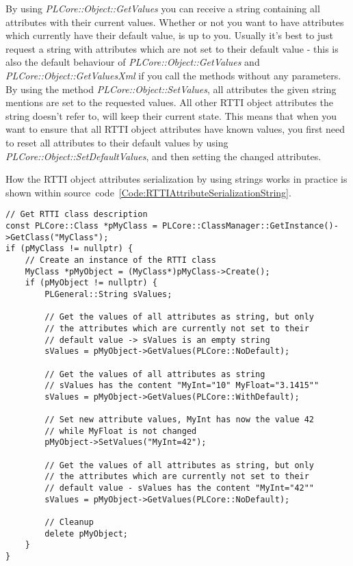 By using \emph{PLCore::Object::GetValues} you can receive a string containing all attributes with their current values. Whether or not you want to have attributes which currently have their default value, is up to you. Usually it's best to just request a string with attributes which are not set to their default value - this is also the default behaviour of \emph{PLCore::Object::GetValues} and \emph{PLCore::Object::GetValuesXml} if you call the methods without any parameters. By using the method \emph{PLCore::Object::SetValues}, all attributes the given string mentions are set to the requested values. All other RTTI object attributes the string doesn't refer to, will keep their current state. This means that when you want to ensure that all RTTI object attributes have known values, you first need to reset all attributes to their default values by using \emph{PLCore::Object::SetDefaultValues}, and then setting the changed attributes.

How the RTTI object attributes serialization by using strings works in practice is shown within source~code~\ref{Code:RTTIAttributeSerializationString}.
\begin{lstlisting}[label=Code:RTTIAttributeSerializationString,caption={RTTI object attributes serialization by using strings}]
// Get RTTI class description
const PLCore::Class *pMyClass = PLCore::ClassManager::GetInstance()->GetClass("MyClass");
if (pMyClass != nullptr) {
	// Create an instance of the RTTI class
	MyClass *pMyObject = (MyClass*)pMyClass->Create();
	if (pMyObject != nullptr) {
		PLGeneral::String sValues;

		// Get the values of all attributes as string, but only
		// the attributes which are currently not set to their
		// default value -> sValues is an empty string
		sValues = pMyObject->GetValues(PLCore::NoDefault);

		// Get the values of all attributes as string
		// sValues has the content "MyInt="10" MyFloat="3.1415""
		sValues = pMyObject->GetValues(PLCore::WithDefault);

		// Set new attribute values, MyInt has now the value 42
		// while MyFloat is not changed
		pMyObject->SetValues("MyInt=42");

		// Get the values of all attributes as string, but only
		// the attributes which are currently not set to their
		// default value - sValues has the content "MyInt="42""
		sValues = pMyObject->GetValues(PLCore::NoDefault);

		// Cleanup
		delete pMyObject;
	}
}
\end{lstlisting}

